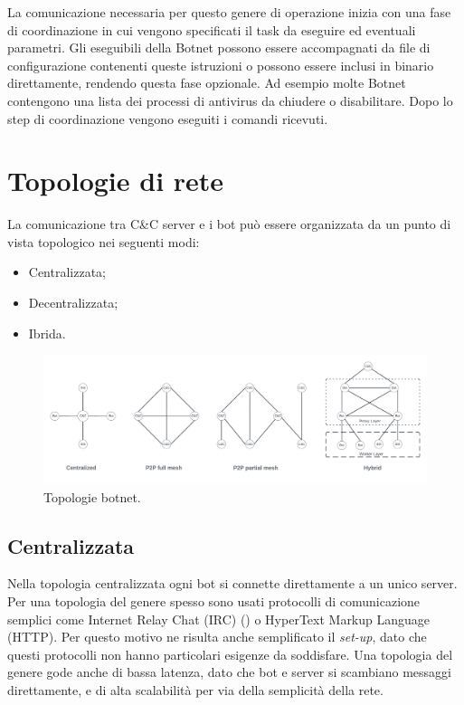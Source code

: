 La comunicazione necessaria per questo genere di operazione inizia con una fase di coordinazione in cui vengono specificati il task da eseguire ed eventuali parametri. Gli eseguibili della Botnet possono essere accompagnati da file di configurazione contenenti queste istruzioni o possono essere inclusi in binario direttamente, rendendo questa fase opzionale. Ad esempio molte Botnet contengono una lista dei processi di antivirus da chiudere o disabilitare. Dopo lo step di coordinazione vengono eseguiti i comandi ricevuti.
\section{Topologie di rete}
La comunicazione tra C\&C server e i bot può essere organizzata da un punto di vista topologico nei seguenti modi:
\begin{itemize}
    \item Centralizzata;
    \item Decentralizzata;
    \item Ibrida.
\end{itemize}

\begin{figure}[H]
    \centering
    \includegraphics[width=\textwidth]{res/fig/topologia.png}
    \caption{Topologie botnet.}
    \label{fig:topologia}
\end{figure}

\subsection{Centralizzata}
Nella topologia centralizzata ogni bot si connette direttamente a un unico server.
Per una topologia del genere spesso sono usati protocolli di comunicazione semplici come Internet Relay Chat (IRC) () o HyperText Markup Language (HTTP). Per questo motivo ne risulta anche semplificato il \textit{set-up}, dato che questi protocolli non hanno particolari esigenze da soddisfare. 
Una topologia del genere gode anche di bassa latenza, dato che bot e server si scambiano messaggi direttamente, e di alta scalabilità per via della semplicità della rete. 

